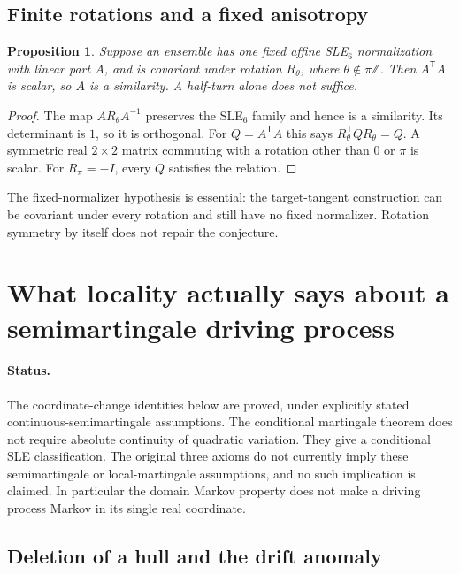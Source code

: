 \documentclass[11pt]{article}
\newtheorem{proposition}[theorem]{Proposition}
\theoremstyle{definition}\newtheorem{definition}[theorem]{Definition}
\theoremstyle{remark}\newtheorem{remark}[theorem]{Remark}
\begin{document}
\subsection{Finite rotations and a fixed anisotropy}

\begin{proposition}
\label{prop:am-rotation}
Suppose an ensemble has one fixed affine SLE$_6$ normalization with linear
part $A$, and is covariant under rotation $R_\theta$, where
$\theta\notin\pi\mathbb Z$. Then $A^{\mathsf T}A$ is scalar, so $A$ is a
similarity. A half-turn alone does not suffice.
\end{proposition}
\begin{proof}
The map $AR_\theta A^{-1}$ preserves the SLE$_6$ family and hence is a
similarity. Its determinant is $1$, so it is orthogonal. For
$Q=A^{\mathsf T}A$ this says $R_\theta^{\mathsf T}QR_\theta=Q$.
A symmetric real $2\times2$ matrix commuting with a rotation other than
$0$ or $\pi$ is scalar. For $R_\pi=-I$, every $Q$ satisfies the relation.
\end{proof}

The fixed-normalizer hypothesis is essential: the target-tangent
construction can be covariant under every rotation and still have no
fixed normalizer. Rotation symmetry by itself does not repair the conjecture.


\section{What locality actually says about a semimartingale driving process}
\label{sec:loewner-locality}

\paragraph{Status.}
The coordinate-change identities below are proved, under explicitly stated
continuous-semimartingale assumptions.  The conditional martingale theorem
does not require absolute continuity of quadratic variation.  They give a conditional SLE
classification.  The original three axioms do not currently imply these
semimartingale or local-martingale assumptions, and no such implication is
claimed.  In particular the domain Markov property does not make a driving
process Markov in its single real coordinate.

\subsection{Deletion of a hull and the drift anomaly}
\end{document}
